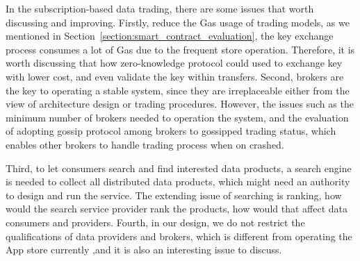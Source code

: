 \documentclass[conference]{IEEEtran}
\begin{document}
In the subscription-based data trading, there are some issues that worth discussing and improving. Firstly, reduce the Gas usage of trading models, as we mentioned in Section~\ref{section:smart_contract_evaluation}, the key exchange process consumes a lot of Gas due to the frequent store operation. Therefore, it is worth discussing that how zero-knowledge protocol could used to exchange key with lower cost, and even validate the key within transfers. Second, brokers are the key to operating a stable system, since they are irreplaceable either from the view of architecture design or trading procedures. However, the issues such as the minimum number of brokers needed to operation the system, and the evaluation of adopting gossip protocol among brokers to gossipped trading status, which enables other brokers to handle trading process when on crashed.

Third, to let consumers search and find interested data products, a search engine is needed to collect all distributed data products, which might need an authority to design and run the service. The extending issue of searching is ranking, how would the search service provider rank the products, how would that affect data consumers and providers. Fourth, in our design, we do not restrict the qualifications of data providers and brokers, which is different from operating the App store currently ,and it is also an interesting issue to discuss.



\end{document}
